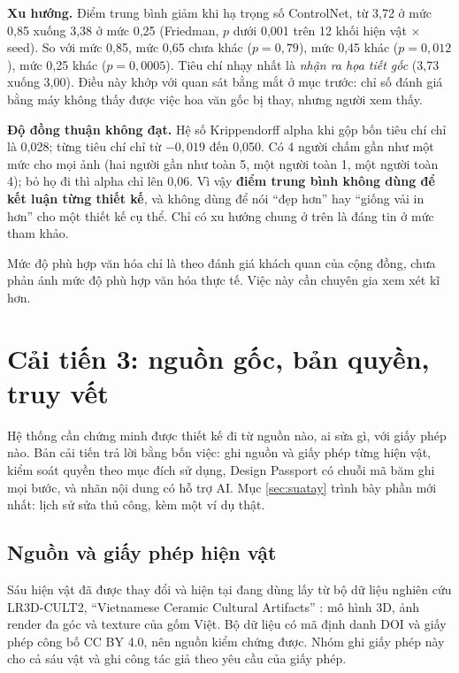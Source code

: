 \documentclass[12pt,a4paper]{report}
\begin{document}
\textbf{Xu hướng.} Điểm trung bình giảm khi hạ trọng số ControlNet, từ 3,72 ở mức 0,85 xuống 3,38 ở mức 0,25 (Friedman, $p$ dưới 0,001 trên 12 khối hiện vật $\times$ seed). So với mức 0,85, mức 0,65 chưa khác ($p=0{,}79$), mức 0,45 khác ($p=0{,}012$), mức 0,25 khác ($p=0{,}0005$). Tiêu chí nhạy nhất là \emph{nhận ra họa tiết gốc} (3,73 xuống 3,00). Điều này khớp với quan sát bằng mắt ở mục trước: chỉ số đánh giá bằng máy không thấy được việc hoa văn gốc bị thay, nhưng người xem thấy.

\textbf{Độ đồng thuận không đạt.} Hệ số Krippendorff alpha \parencite{krippendorff2011} khi gộp bốn tiêu chí chỉ là 0,028; từng tiêu chí chỉ từ $-0{,}019$ đến 0,050. Có 4 người chấm gần như một mức cho mọi ảnh (hai người gần như toàn 5, một người toàn 1, một người toàn 4); bỏ họ đi thì alpha chỉ lên 0,06. Vì vậy \textbf{điểm trung bình không dùng để kết luận từng thiết kế}, và không dùng để nói “đẹp hơn” hay “giống vải in hơn” cho một thiết kế cụ thể. Chỉ có xu hướng chung ở trên là đáng tin ở mức tham khảo.

Mức độ phù hợp văn hóa chỉ là theo đánh giá khách quan của cộng đồng, chưa phản ánh mức độ phù hợp văn hóa thực tế. Việc này cần chuyên gia xem xét kĩ hơn.



\chapter{Cải tiến 3: nguồn gốc, bản quyền, truy vết}

Hệ thống cần chứng minh được thiết kế đi từ nguồn nào, ai sửa gì, với giấy phép nào. Bản cải tiến trả lời bằng bốn việc: ghi nguồn và giấy phép từng hiện vật, kiểm soát quyền theo mục đích sử dụng, Design Passport có chuỗi mã băm ghi mọi bước, và nhãn nội dung có hỗ trợ AI. Mục \ref{sec:suatay} trình bày phần mới nhất: lịch sử sửa thủ công, kèm một ví dụ thật.

\section{Nguồn và giấy phép hiện vật}
\label{sec:nguon}

Sáu hiện vật đã được thay đổi và hiện tại đang dùng lấy từ bộ dữ liệu nghiên cứu LR3D-CULT2, “Vietnamese Ceramic Cultural Artifacts” \parencite{lr3dcult2}: mô hình 3D, ảnh render đa góc và texture của gốm Việt. Bộ dữ liệu có mã định danh DOI và giấy phép công bố CC BY 4.0, nên nguồn kiểm chứng được. Nhóm ghi giấy phép này cho cả sáu vật và ghi công tác giả theo yêu cầu của giấy phép.
\end{document}

